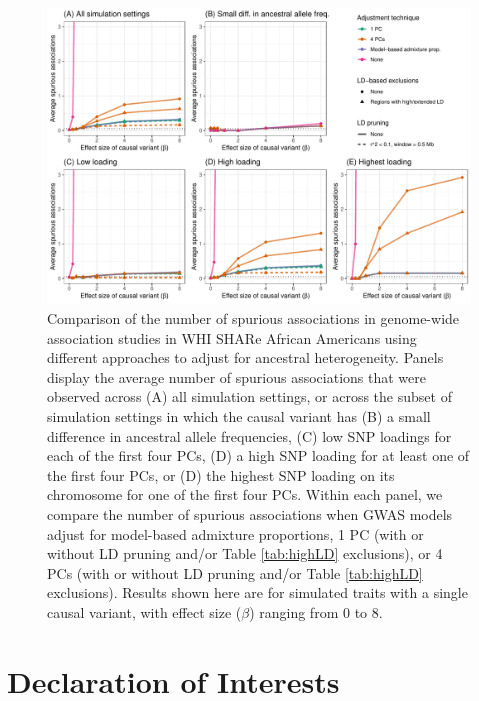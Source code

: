 \documentclass[12pt]{article}
\begin{document}
\begin{figure}[h]
\includegraphics[width=\textwidth]{figs/spurious_counts/gwas/supplement_spurious_allbeta}
\caption{Comparison of the number of spurious associations in genome-wide association studies in WHI SHARe African Americans using different approaches to adjust for ancestral heterogeneity. Panels display the average number of spurious associations that were observed across (A) all simulation settings, or across the subset of simulation settings in which the causal variant has (B) a small difference in ancestral allele frequencies, (C) low SNP loadings for each of the first four PCs, (D) a high SNP loading for at least one of the first four PCs, or (D) the highest SNP loading on its chromosome for one of the first four PCs. Within each panel, we compare the number of spurious associations when GWAS models adjust for model-based admixture proportions, 1 PC (with or without LD pruning and/or Table \ref{tab:highLD} exclusions), or 4 PCs (with or without LD pruning and/or Table \ref{tab:highLD} exclusions). Results shown here are for simulated traits with a single causal variant, with effect size ($\beta$) ranging from 0 to 8.}
\label{fig:spurious-all-beta}
\end{figure}


\section*{Declaration of Interests}

\end{document}
